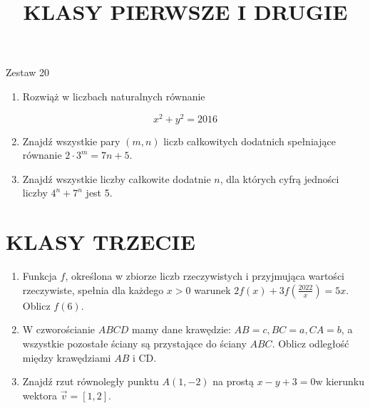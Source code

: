 \documentclass[10pt]{article}
\title{KLASY PIERWSZE I DRUGIE }
\author{}
\date{}
\begin{document}
\maketitle
Zestaw 20

\begin{enumerate}
  \item Rozwiąż w liczbach naturalnych równanie
\end{enumerate}

\[
x^{2}+y^{2}=2016
\]

\begin{enumerate}
  \setcounter{enumi}{1}
  \item Znajdź wszystkie pary \((m, n)\) liczb całkowitych dodatnich spełniające równanie \(2 \cdot 3^{m}=7 n+5\).
  \item Znajdź wszystkie liczby całkowite dodatnie \(n\), dla których cyfrą jedności liczby \(4^{n}+7^{n}\) jest 5.
\end{enumerate}

\section*{KLASY TRZECIE}
\begin{enumerate}
  \item Funkcja \(f\), określona w zbiorze liczb rzeczywistych i przyjmująca wartości rzeczywiste, spełnia dla każdego \(x>0\) warunek \(2 f(x)+3 f\left(\frac{2022}{x}\right)=5 x\). Oblicz \(f(6)\).
  \item W czworościanie \(A B C D\) mamy dane krawędzie: \(A B=c, B C=a, C A=b\), a wszystkie pozostałe ściany są przystające do ściany \(A B C\). Oblicz odległość między krawędziami \(A B\) i CD.
  \item Znajdź rzut równoległy punktu \(A(1,-2)\) na prostą \(x-y+3=0 \mathrm{w}\) kierunku wektora \(\vec{v}=[1,2]\).
\end{enumerate}
\end{document}
